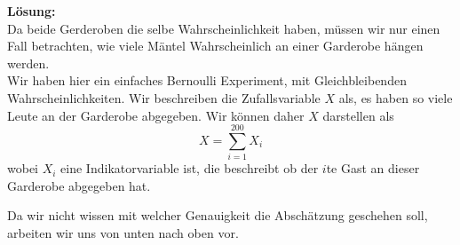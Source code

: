 \documentclass[11pt,a4paper,ngerman]{article}
\begin{document}
\textbf{Lösung:}\\

Da beide Gerderoben die selbe Wahrscheinlichkeit haben, müssen wir nur einen Fall betrachten, wie viele Mäntel Wahrscheinlich an einer Garderobe hängen werden.\\
Wir haben hier ein einfaches Bernoulli Experiment, mit Gleichbleibenden Wahrscheinlichkeiten. Wir beschreiben die Zufallsvariable $X$ als, es haben so viele
Leute an der Garderobe abgegeben. Wir können daher $X$ darstellen als
\[
    X = \sum_{i=1}^{200} X_i
\]
wobei $X_i$ eine Indikatorvariable ist, die beschreibt ob der $i$te Gast an dieser Garderobe abgegeben hat.

Da wir nicht wissen mit welcher Genauigkeit die Abschätzung geschehen soll, arbeiten wir uns von unten nach oben vor.\\
\end{document}

